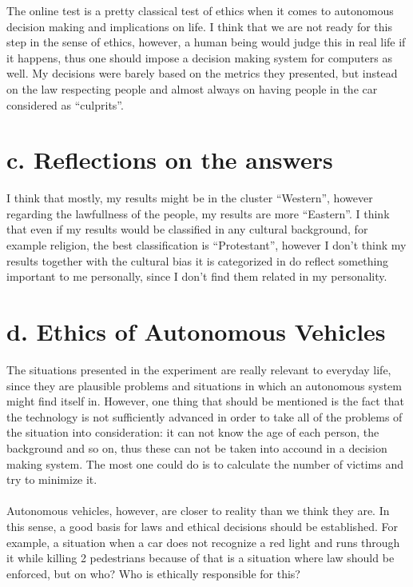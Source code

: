 \documentclass[english]{report}
\begin{document}
\noindent
The online test is a pretty classical test of ethics when it comes to autonomous decision making and implications on life. I think that we are not ready for this step in the sense of ethics, however, a human being would judge this in real life if it happens, thus one should impose a decision making system for computers as well. My decisions were barely based on the metrics they presented, but instead on the law respecting people and almost always on having people in the car considered as ``culprits''.

\section*{c. Reflections on the answers}

I think that mostly, my results might be in the cluster ``Western'', however regarding the lawfullness of the people, my results are more ``Eastern''. I think that even if my results would be classified in any cultural background, for example religion, the best classification is ``Protestant'', however I don't think my results together with the cultural bias it is categorized in do reflect something important to me personally, since I don't find them related in my personality.

\section*{d. Ethics of Autonomous Vehicles}

The situations presented in the experiment are really relevant to everyday life, since they are plausible problems and situations in which an autonomous system might find itself in. However, one thing that should be mentioned is the fact that the technology is not sufficiently advanced in order to take all of the problems of the situation into consideration: it can not know the age of each person, the background and so on, thus these can not be taken into accound in a decision making system. The most one could do is to calculate the number of victims and try to minimize it.\\\\

\noindent
Autonomous vehicles, however, are closer to reality than we think they are. In this sense, a good basis for laws and ethical decisions should be established. For example, a situation when a car does not recognize a red light and runs through it while killing 2 pedestrians because of that is a situation where law should be enforced, but on who? Who is ethically responsible for this?
\end{document}
